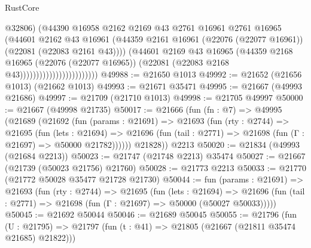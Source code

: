 \begin{lexlean}{RustCore}
\begin{coremodule}
                                            @32806)
                                          (@44390
                                            @16958
                                            @2162
                                            @2169
                                            @43
                                            @2761
                                            @16961
                                            @2761
                                            @16965
                                            (@44601
                                              @2162
                                              @43
                                              @16961
                                              (@44359
                                                @2161
                                                @16961
                                                (@22076 (@22077 @16961))
                                                (@22081 (@22083 @2161 @43))))
                                            (@44601
                                              @2169
                                              @43
                                              @16965
                                              (@44359
                                                @2168
                                                @16965
                                                (@22076 (@22077 @16965))
                                                (@22081 (@22083 @2168 @43))))))))))))))))))))))))
@49988 := @21650 @1013
@49992 := @21652 (@21656 @1013) (@21662 @1013)
@49993 := @21671 @35471
@49995 := @21667 (@49993 @21686)
@49997 := @21709 (@21710 @1013)
@49998 := @21705 @49997
@50000 := @21667 (@49998 @21735)
@50017 := @21666
    (fun (fn : @7) =>
    @49995
      (@21689
        (@21692
          (fun (params : @21691) =>
          @21693
            (fun (rty : @2744) =>
            @21695
              (fun (lets : @21694) =>
              @21696 (fun (tail : @2771) => @21698 (fun (Γ : @21697) => @50000 @21782))))))
        @21828))
    @2213
@50020 := @21834 (@49993 (@21684 @2213))
@50023 := @21747 (@21748 @2213) @35474
@50027 := @21667 (@21739 (@50023 @21756) @21760)
@50028 := @21773 @2213
@50033 := @21770 (@21772 @50028 @35477 @21728 @21730)
@50044 := fun (params : @21691) =>
  @21693
    (fun (rty : @2744) =>
    @21695
      (fun (lets : @21694) =>
      @21696 (fun (tail : @2771) => @21698 (fun (Γ : @21697) => @50000 (@50027 @50033)))))
@50045 := @21692 @50044
@50046 := @21689 @50045
@50055 := @21796
    (fun (U : @21795) => @21797 (fun (t : @41) => @21805 (@21667 (@21811 @35474 @21685) @21822)))

\end{coremodule}
\end{lexlean}
